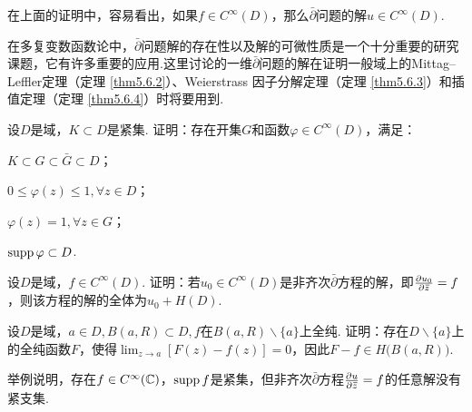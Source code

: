 在上面的证明中，容易看出，如果$f\in C^\infty(D)$，那么$\bar\partial$问题的解$u\in C^\infty(D)$.

在多复变数函数论中，$\bar\partial$问题解的存在性以及解的可微性质是一个十分重要的研究课题，它有许多重要的应用.这里讨论的一维$\bar\partial$问题的解在证明一般域上的Mittag--Leffler定理（定理 \ref{thm5.6.2}）、Weierstrass 因子分解定理（定理 \ref{thm5.6.3}）和插值定理（定理
 \ref{thm5.6.4}）时将要用到.
\begin{xiti}
  \item 设$D$是域，$K\subset D$是紧集. 证明：存在开集$G$和函数$\varphi\in C^\infty(D)$，满足：
    \begin{enuma}
      \item $K\subset G\subset \bar G\subset D$；
      \item $0\le\varphi(z)\le1,\forall z\in D$；
      \item $\varphi(z)=1,\forall z\in G$；
      \item $\operatorname{supp}\varphi\subset D$.
    \end{enuma}
  \item 设$D$是域，$f\in C^\infty(D)$. 证明：若$u_0\in C^\infty(D)$是非齐次$\bar\partial$方程的解，即$\frac{\partial u_0}{\partial {}\mkern2mu\overline{\mkern-2muz}}=f$，则该方程的解的全体为$u_0+H(D)$.
  \item 设$D$是域，$a\in D,B(a,R)\subset D,f$在$B(a,R)\backslash\{a\}$上全纯. 证明：存在$D\backslash\{a\}$上的全纯函数$F$，使得$\lim_{z\to a}[F(z)-f(z)]=0$，因此$F-f\in H\big(B(a,R)\big)$.
  \item 举例说明，存在$f\in C^\infty(\mathbb C)$，$\operatorname{supp} f$是紧集，但非齐次$\bar\partial$方程$\frac{\partial u}{\partial {}\mkern2mu\overline{\mkern-2muz}}=f$的任意解没有紧支集.
\end{xiti}
